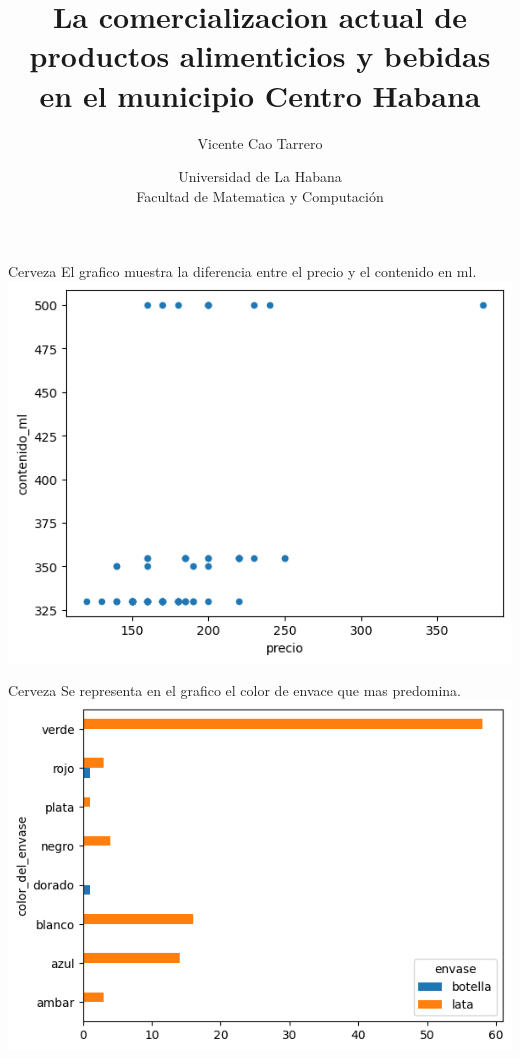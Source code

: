 \documentclass{beamer}
\title{La comercializacion actual de productos alimenticios y bebidas en el municipio Centro Habana}
\date{Universidad de La Habana\\Facultad de Matematica y Computación}
\author{Vicente Cao Tarrero}
\begin{document}
\begin{frame}
\titlepage{}
\end{frame}

\begin{frame}{Cerveza}
    El grafico muestra la diferencia entre el precio y el contenido en ml.
    \includegraphics[scale=0.5]{Cerv_tipo_de_envace_precio.png}
    \end{frame}

\begin{frame}{Cerveza}
    Se representa en el grafico el color de envace que mas predomina.
    \includegraphics[scale=0.5]{Cerv_tipo_de_envace.png}
    \end{frame}
\end{document}
